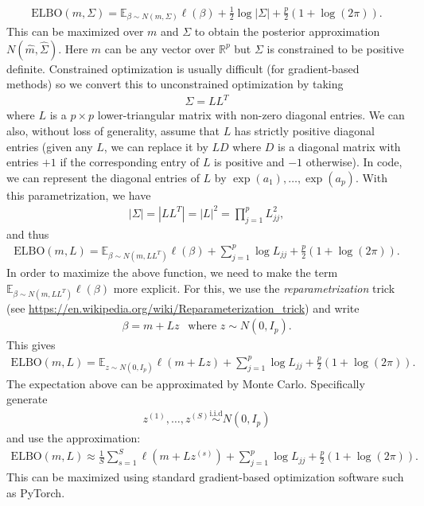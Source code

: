 \documentclass{scrartcl}
\newcommand{\E}{{\mathbb E}}
\newcommand{\R}{{\mathbb R}}
\begin{document}
\begin{align*}
  \text{ELBO}(m, \Sigma) = \E_{\beta \sim N(m, \Sigma)} \ell(\beta) +
  \frac{1}{2} \log |\Sigma| + \frac{p}{2} \left(1 + \log(2 \pi)
  \right). 
\end{align*}
This can be maximized over $m$ and $\Sigma$ to obtain the posterior
approximation $N(\hat{m}, \hat{\Sigma})$. Here $m$ can be any vector
over $\R^p$ but $\Sigma$ is constrained to be positive
definite. Constrained optimization is usually difficult (for
gradient-based methods) so we convert this to unconstrained
optimization by taking
\begin{align*}
  \Sigma = L L^T
\end{align*}
where $L$ is a $p \times p$ lower-triangular matrix with non-zero
diagonal entries. We can also, without loss of generality, assume that
$L$ has strictly positive diagonal entries (given any $L$, we can
replace it by $L D$ where $D$ is a diagonal matrix with entries $+1$
if the corresponding entry of $L$ is positive and $-1$
otherwise). In code, we can represent the diagonal entries of $L$ by
$\exp(a_1), \dots, \exp(a_p)$. With this parametrization, we have
\begin{align*}
|\Sigma| = |L L^T| = |L|^2 = \prod_{j=1}^p L_{jj}^2, 
\end{align*}
and thus
\begin{align*}
  \text{ELBO}(m, L) = \E_{\beta \sim N(m, L L^T)} \ell(\beta) +
  \sum_{j=1}^p \log L_{jj} + \frac{p}{2} \left(1 + \log(2 \pi)
  \right). 
\end{align*}
In order to maximize the above function, we need to make the term
$\E_{\beta \sim N(m, L L^T)} \ell(\beta)$ more explicit. For this, we
use the \textit{reparametrization} trick (see
\url{https://en.wikipedia.org/wiki/Reparameterization_trick}) and
write
\begin{align*}
  \beta = m + L z ~~ \text{ where $z \sim N(0, I_p)$}. 
\end{align*}
This gives
\begin{align*}
  \text{ELBO}(m, L) = \E_{z \sim N(0, I_p)} \ell(m + L z) +
  \sum_{j=1}^p \log L_{jj} + \frac{p}{2} \left(1 + \log(2 \pi)
  \right).  
\end{align*}
The expectation above can be approximated by Monte Carlo. Specifically
generate
\begin{align*}
  z^{(1)}, \dots, z^{(S)} \overset{\text{i.i.d}}{\sim} N(0, I_p)
\end{align*}
and use the approximation:
\begin{align*}
  \text{ELBO}(m, L) \approx \frac{1}{S} \sum_{s=1}^S \ell(m + L
  z^{(s)}) +
  \sum_{j=1}^p \log L_{jj} + \frac{p}{2} \left(1 + \log(2 \pi)
  \right).  
\end{align*}
This can be maximized using standard gradient-based optimization
software such as PyTorch. 
\end{document}
